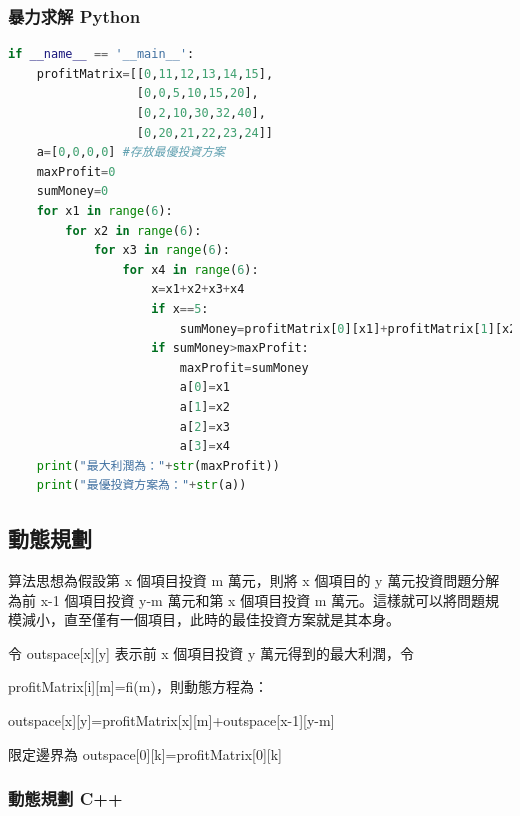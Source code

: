 \documentclass[10pt,UTF8]{ctexart}
\begin{document}
\subsubsection{暴力求解 Python}

\begin{lstlisting}[language={python}]
if __name__ == '__main__':
    profitMatrix=[[0,11,12,13,14,15],
                  [0,0,5,10,15,20],
                  [0,2,10,30,32,40],
                  [0,20,21,22,23,24]]
    a=[0,0,0,0] #存放最優投資方案
    maxProfit=0
    sumMoney=0
    for x1 in range(6):
        for x2 in range(6):
            for x3 in range(6):
                for x4 in range(6):
                    x=x1+x2+x3+x4
                    if x==5:
                        sumMoney=profitMatrix[0][x1]+profitMatrix[1][x2]+profitMatrix[2][x3]+profitMatrix[3][x4]
                    if sumMoney>maxProfit:
                        maxProfit=sumMoney
                        a[0]=x1
                        a[1]=x2
                        a[2]=x3
                        a[3]=x4
    print("最大利潤為："+str(maxProfit))
    print("最優投資方案為："+str(a))
\end{lstlisting}

\subsection{動態規劃}

算法思想為假設第 x 個項目投資 m 萬元，則將 x 個項目的 y 萬元投資問題分解為前 x-1 個項目投資 y-m 萬元和第 x 個項目投資 m 萬元。這樣就可以將問題規模減小，直至僅有一個項目，此時的最佳投資方案就是其本身。

令 outspace[x][y] 表示前 x 個項目投資 y 萬元得到的最大利潤，令

profitMatrix[i][m]=fi(m)，則動態方程為：

outspace[x][y]=profitMatrix[x][m]+outspace[x-1][y-m]

限定邊界為 outspace[0][k]=profitMatrix[0][k]

\subsubsection{動態規劃 C++}
\end{document}
